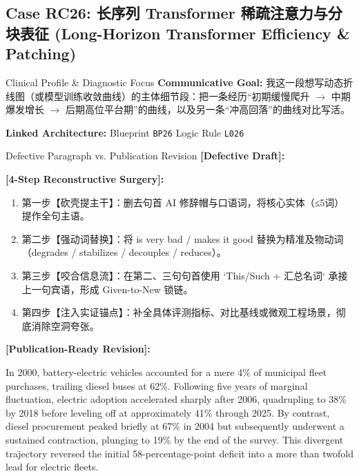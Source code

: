 \subsection{Case RC26: 长序列 Transformer 稀疏注意力与分块表征 (Long-Horizon Transformer Efficiency \& Patching)}\label{case:RC26}
\begin{ConceptBox}{Clinical Profile \& Diagnostic Focus}
\textbf{Communicative Goal:} 我这一段想写动态折线图（或模型训练收敛曲线）的主体细节段：把一条经历“初期缓慢爬升 $\to$ 中期爆发增长 $\to$ 后期高位平台期”的曲线，以及另一条“冲高回落”的曲线对比写活。\par
\textbf{Linked Architecture:} Blueprint \texttt{BP26} \enspace\textbar\enspace Logic Rule \texttt{L026}
\end{ConceptBox}
\begin{ExampleBox}{Defective Paragraph vs. Publication Revision}
\textbf{\color{TargetHighlight}[Defective Draft]:}\par
{}\par\vspace{6pt}
\textbf{\color{AcadForest}[4-Step Reconstructive Surgery]:}
\begin{enumerate}[label=\textbf{\color{AcadNavy}Step \arabic*:}, leftmargin=2em]
  \item 第一步【砍壳提主干】：删去句首 AI 修辞帽与口语词，将核心实体（≤5词）提作全句主语。
  \item 第二步【强动词替换】：将 is very bad / makes it good 替换为精准及物动词（degrades / stabilizes / decouples / reduces）。
  \item 第三步【咬合信息流】：在第二、三句句首使用 `This/Such + 汇总名词` 承接上一句宾语，形成 Given-to-New 锁链。
  \item 第四步【注入实证锚点】：补全具体评测指标、对比基线或微观工程场景，彻底消除空洞夸张。
\end{enumerate}\vspace{4pt}
\textbf{\color{AcadNavy}[Publication-Ready Revision]:}\par
In 2000, battery-electric vehicles accounted for a mere 4\% of municipal fleet purchases, trailing diesel buses at 62\%. Following five years of marginal fluctuation, electric adoption accelerated sharply after 2006, quadrupling to 38\% by 2018 before leveling off at approximately 41\% through 2025. By contrast, diesel procurement peaked briefly at 67\% in 2004 but subsequently underwent a sustained contraction, plunging to 19\% by the end of the survey. This divergent trajectory reversed the initial 58-percentage-point deficit into a more than twofold lead for electric fleets.
\end{ExampleBox}
